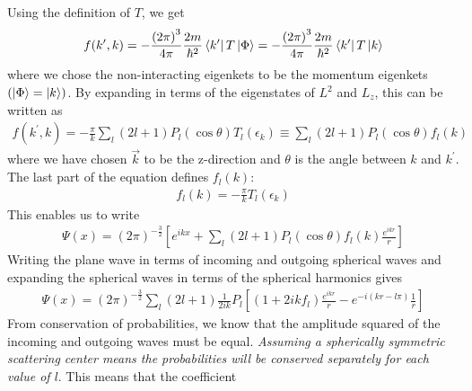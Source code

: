 \documentclass[twoside]{report}
\numberwithin{equation}{section}
\begin{document}
Using the definition of \(T\), we get
\begin{equation}\begin{aligned}
\label{f_in_T}
f(k^\prime,k) = - \frac{\left( 2\pi \right) ^3}{4\pi} \frac{2m}{\hbar^2}\bra{k^\prime}T\ket{\Phi} = -\frac{\left( 2\pi \right) ^3}{4\pi} \frac{2m}{\hbar^2}\bra{k^\prime}T\ket{k}
\end{aligned}\end{equation}
where we chose the non-interacting eigenkets to be the momentum eigenkets \(\left( \ket{\Phi} = \ket{k} \right) \). By expanding in terms of the eigenstates of \(L^2\) and \(L_z\), this can be written as
\begin{equation}\begin{aligned}
	f(k^\prime,k) = - \frac{\pi}{k}\sum_l (2l+1)P_l\left( \cos \theta \right) T_l(\epsilon_k) \equiv \sum_l (2l+1)P_l\left( \cos \theta \right) f_l\left( k \right) 
\end{aligned}\end{equation}
where we have chosen \(\vec k\) to be the z-direction and \(\theta\) is the angle between \(k\) and \(k^\prime\). The last part of the equation defines \(f_l(k)\):
\begin{equation}\begin{aligned}
	f_l(k) = - \frac{\pi}{k} T_l(\epsilon_k)
\end{aligned}\end{equation}
This enables us to write
\begin{equation}\begin{aligned}
	\Psi(x) = \left(2\pi\right)^{-\frac{3}{2}}\left[e^{ikx} + \sum_l (2l+1)P_l\left( \cos \theta \right) f_l\left(k\right) \frac{e^{ikr}}{r}\right]
\end{aligned}\end{equation}
Writing the plane wave in terms of incoming and outgoing spherical waves and expanding the spherical waves in terms of the spherical harmonics gives
\begin{equation}\begin{aligned}
	\Psi(x) = \left(2\pi\right)^{-\frac{3}{2}}\sum_l (2l+1) \frac{1}{2ik}P_l\left[\left(1 + 2i k f_l \right) \frac{e^{ikr}}{r} - e^{-i\left( kr - l\pi \right) } \frac{1}{r}\right]
\end{aligned}\end{equation}
From conservation of probabilities, we know that the amplitude squared of the incoming and outgoing waves must be equal. \textit{Assuming a spherically symmetric scattering center means the probabilities will be conserved separately for each value of \(l\)}. This means that the coefficient 
\end{document}
